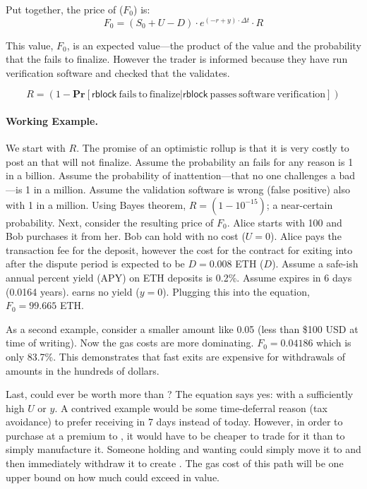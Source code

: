 Put together, the price of \ethxx ($F_0$) is: \[ F_0 = (S_0 + U - D)\cdot e^{(-r+y)\cdot\Delta t} \cdot R \]

This value, $F_0$, is an expected value---the product of the value and the probability that the \rblock fails to finalize. However the trader is informed because they have run verification software and checked that the \rblock validates.


\[ R = (1-\mathbf{Pr}[ \mathrm{\mathsf{rblock}~fails~to~finalize} |  \mathrm{\mathsf{rblock}~passes~software~verification} ]) \]

\paragraph{Working Example.} We start with $R$. The promise of an optimistic rollup is that it is very costly to post an \rblock that will not finalize. Assume the probability an \rblock fails for any reason is 1 in a billion. Assume the probability of inattention---that no one challenges a bad \rblock---is 1 in a million. Assume the validation software is wrong (false positive) also with 1 in a million. Using Bayes theorem, $R=(1-10^{-15})$; a near-certain probability. Next, consider the resulting price of $F_0$. Alice starts with 100 \ethxx and Bob purchases it from her. Bob can hold \ethxx with no cost ($U=0$). Alice pays the transaction fee for the deposit, however the cost for the contract for exiting \ethxx into \ethone after the dispute period is expected to be $D=0.008$ ETH ($D$). Assume a safe-ish annual percent yield (APY) on ETH deposits is 0.2\%. Assume \ethxx expires in 6 days (0.0164 years). \ethxx earns no yield ($y=0$). Plugging this into the equation, $F_0=99.665$ ETH.

As a second example, consider a smaller amount like 0.05 \ethxx (less than \$100 USD at time of writing). Now the gas costs are more dominating. $F_0=0.04186$ \ethone which is only 83.7\%. This demonstrates that fast exits are expensive for withdrawals of amounts in the hundreds of dollars.

Last, could \ethxx ever be worth more than \ethone? The equation says yes: with a sufficiently high $U$ or $y$. A contrived example would be some time-deferral reason (\eg tax avoidance) to prefer receiving \ethone in 7 days instead of today. However, in order to purchase \ethxx at a premium to \ethone, it would have to be cheaper to trade for it than to simply manufacture it. Someone holding \ethone and wanting \ethxx could simply move it to \layertwo and then immediately withdraw it to create \ethxx. The gas cost of this path will be one upper bound on how much \ethxx could exceed \ethone in value. 

